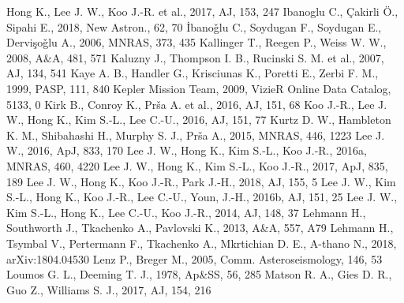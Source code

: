 \documentclass[useAMS,usenatbib,usegraphicx]{mn2e}
\begin{document}
\begin{thebibliography}{99}
 Hong K., Lee J. W., Koo J.-R. et al., 2017, AJ, 153, 247
 Ibanoglu C., \c Cakirli \" O., Sipahi E., 2018, New Astron., 62, 70
 \. Ibano\v{g}lu C., Soydugan F., Soydugan E., Dervi\c so\v{g}lu A., 2006, MNRAS, 373, 435
 Kallinger T., Reegen P., Weiss W. W., 2008, A\&A, 481, 571
 Kaluzny J., Thompson I. B., Rucinski S. M. et al., 2007, AJ, 134, 541
 Kaye A. B., Handler G., Krisciunas K., Poretti E., Zerbi F. M., 1999, PASP, 111, 840
 Kepler Mission Team, 2009, VizieR Online Data Catalog, 5133, 0
 Kirk B., Conroy K., Pr\v sa A. et al., 2016, AJ, 151, 68
 Koo J.-R., Lee J. W., Hong K., Kim S.-L., Lee C.-U., 2016, AJ, 151, 77
 Kurtz D. W., Hambleton K. M., Shibahashi H., Murphy S. J., Pr\v sa A., 2015, MNRAS, 446, 1223
 Lee J. W., 2016, ApJ, 833, 170
 Lee J. W., Hong K., Kim S.-L., Koo J.-R., 2016a, MNRAS, 460, 4220
 Lee J. W., Hong K., Kim S.-L., Koo J.-R., 2017, ApJ, 835, 189
 Lee J. W., Hong K., Koo J.-R., Park J.-H., 2018, AJ, 155, 5
 Lee J. W., Kim S.-L., Hong K., Koo J.-R., Lee C.-U., Youn, J.-H., 2016b, AJ, 151, 25
 Lee J. W., Kim S.-L., Hong K., Lee C.-U., Koo J.-R., 2014, AJ, 148, 37
 Lehmann H., Southworth J., Tkachenko A., Pavlovski K., 2013, A\&A, 557, A79
 Lehmann H., Tsymbal V., Pertermann F., Tkachenko A., Mkrtichian D. E., A-thano N., 2018, arXiv:1804.04530
 Lenz P., Breger M., 2005, Comm. Asteroseismology, 146, 53
 Loumos G. L., Deeming T. J., 1978, Ap\&SS, 56, 285
 Matson R. A., Gies D. R., Guo Z., Williams S. J., 2017, AJ, 154, 216

\end{thebibliography}
\end{document}
